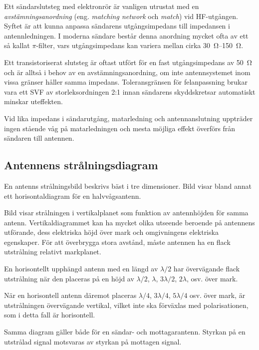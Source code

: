 Ett sändarslutsteg med elektronrör är vanligen utrustat med en
\emph{avstämningsanordning} (eng. \emph{matching network} och \emph{match})
vid HF-utgången.
Syftet är att kunna anpassa sändarens utgångsimpedans till impedansen i
antennledningen.
I moderna sändare består denna anordning mycket ofta av ett så kallat
\(\pi \)-filter, vars utgångsimpedans kan variera mellan cirka
\SIrange{30}{150}{\ohm}.

Ett transistoriserat slutsteg är oftast utfört för en fast utgångsimpedans av
\SI{50}{\ohm} och är alltså i behov av en avstämningsanordning, om inte
antennsystemet inom vissa gränser håller samma impedans.
Toleransgränsen för felanpassning brukar vara ett SVF av storleksordningen 2:1
innan sändarens skyddskretsar automatiskt minskar uteffekten.

Vid lika impedans i sändarutgång, matarledning och antennanslutning
uppträder ingen stående våg på matarledningen och mesta möjliga effekt
överförs från sändaren till antennen.

\subsection{Antennens strålningsdiagram}


En antenns strålningsbild beskrivs bäst i tre dimensioner.
Bild  visar bland annat ett horisontaldiagram för en
halvvågsantenn.

Bild  visar strålningen i vertikalplanet som funktion av
antennhöjden för samma antenn.
Vertikaldiagrammet kan ha mycket olika utseende beroende på antennens utförande,
dess elektriska höjd över mark och omgivningens elektriska egenskaper.
För att överbrygga stora avstånd, måste antennen ha en flack utstrålning
relativt markplanet.

En horisontellt upphängd antenn med en längd av \(\lambda/2\) har övervägande
flack utstrålning när den placeras på en höjd av \(\lambda/2\), \(\lambda\),
\(3\lambda/2\), \(2\lambda\), osv. över mark.

När en horisontell antenn däremot placeras \(\lambda/4\), \(3\lambda/4\),
\(5\lambda/4\) osv. över mark, är utstrålningen övervägande vertikal, vilket
inte ska förväxlas med polarisationen, som i detta fall är horisontell.

Samma diagram gäller både för en sändar- och mottagarantenn.
Styrkan på en utstrålad signal motsvaras av styrkan på mottagen signal.

